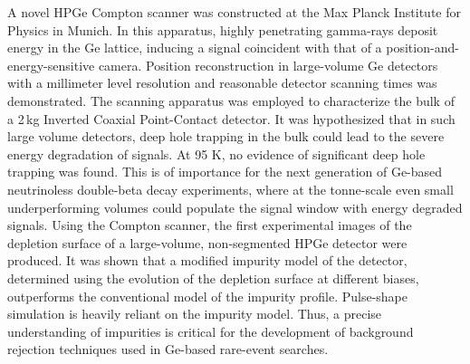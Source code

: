 A novel HPGe Compton scanner was constructed at the Max Planck Institute for Physics in Munich. In this apparatus, highly penetrating gamma-rays deposit energy in the Ge lattice, inducing a signal coincident with that of a position-and-energy-sensitive camera. Position reconstruction in large-volume Ge detectors with a millimeter level resolution and reasonable detector scanning times was demonstrated. The scanning apparatus was employed to characterize the bulk of a 2\,kg Inverted Coaxial Point-Contact detector. It was hypothesized that in such large volume detectors, deep hole trapping in the bulk could lead to the severe energy degradation of signals. At 95 K, no evidence of significant deep hole trapping was found. This is of importance for the next generation of Ge-based neutrinoless double-beta decay experiments, where at the tonne-scale even small underperforming volumes could populate the signal window with energy degraded signals. Using the Compton scanner, the first experimental images of the depletion surface of a large-volume, non-segmented HPGe detector were produced. It was shown that a modified impurity model of the detector, determined using the evolution of the depletion surface at different biases, outperforms the conventional model of the impurity profile. Pulse-shape simulation is heavily reliant on the impurity model. Thus, a precise understanding of impurities is critical for the development of background rejection techniques used in Ge-based rare-event searches.

\clearpage

